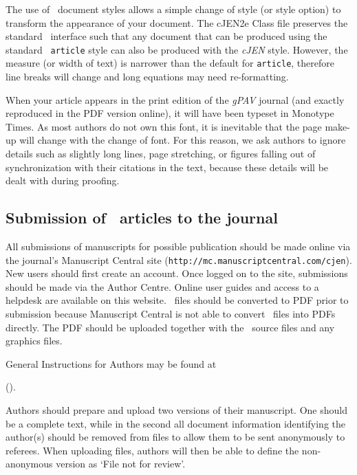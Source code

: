 \documentclass[]{cJEN2e}
\begin{document}
The use of \LaTeXe\ document styles allows a simple change of style (or style option) to transform the appearance
of your document. The cJEN2e Class file preserves the standard \LaTeXe\ interface such that any document that can
be produced using the standard \LaTeXe\ {\tt article} style can also be produced with the {\it cJEN} style.
However, the measure (or width of text) is narrower than the default for {\tt article}, therefore line breaks
will change and long equations may need re-formatting.

When your article appears in the print edition of the {\it gPAV} journal (and exactly reproduced in the PDF
version online), it will have been typeset in Monotype Times. As most authors do not own this font, it is inevitable that the page make-up will change with the change of font. For this reason, we ask authors to ignore details such as slightly long lines, page stretching, or figures falling out of synchronization with their citations in the text, because these details will be dealt with during proofing.

\subsection{Submission of \LaTeXe\ articles to the journal}\label{S1.2}

All submissions of manuscripts for possible publication should be made online via the journal's Manuscript Central site ({\tt{http://mc.manuscriptcentral.com/cjen}}). New users should first create an account. Once logged on to the site, submissions should be made via the Author Centre. Online user guides and access to a helpdesk are available on this website. \LaTeXe\ files should be converted to PDF prior to submission because Manuscript Central is not able to convert \LaTeXe\ files into PDFs directly. The PDF should be uploaded together with the \LaTeXe\ source files and any graphics files.

General Instructions for Authors may be found at
\begin{center}().\end{center}

Authors should prepare and upload two versions of their manuscript. One should be a complete text, while in the second all document information identifying the author(s) should be removed from files to allow them to be sent anonymously to referees. When uploading files, authors will then be able to define the non-anonymous version as `File not for review'.
\end{document}
